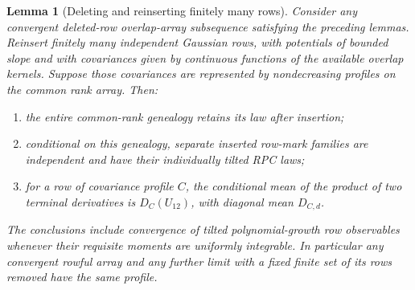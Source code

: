 \documentclass[11pt,a4paper]{article}
\numberwithin{equation}{section}
\newtheorem{lemma}[theorem]{Lemma}
\theoremstyle{definition}
\theoremstyle{remark}
\begin{document}
\begin{lemma}[Deleting and reinserting finitely many rows]
\label{lem:press-row-insertion}
Consider any convergent deleted-row overlap-array subsequence satisfying the
preceding lemmas. Reinsert finitely many independent Gaussian rows, with
potentials of bounded slope and with covariances given by continuous functions
of the available overlap kernels. Suppose those covariances are represented
by nondecreasing profiles on the common rank array. Then:
\begin{enumerate}[label=(\roman*)]
\item the entire common-rank genealogy retains its law after insertion;
\item conditional on this genealogy, separate inserted row-mark families are
independent and have their individually tilted RPC laws;
\item for a row of covariance profile $C$, the conditional mean of the product
of two terminal derivatives is $D_C(U_{12})$, with diagonal mean $D_{C,d}$.
\end{enumerate}
The conclusions include convergence of tilted polynomial-growth row
observables whenever their requisite moments are uniformly integrable.
In particular any convergent rowful array and any further limit with a fixed
finite set of its rows removed have the same profile.
\end{lemma}
\end{document}
